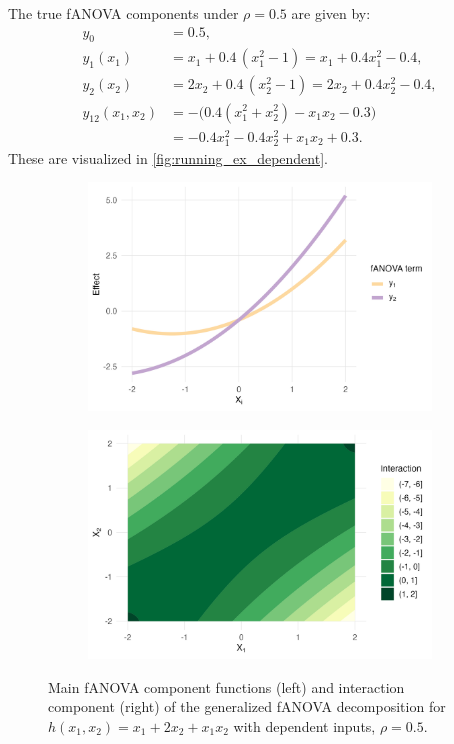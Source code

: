 The true fANOVA components under $\rho = 0.5$ are given by:
\begin{align*}
y_0 &= 0.5, \\[3pt]
y_1(x_1) &= x_1 + 0.4\,(x_1^2 - 1)
        = x_1 + 0.4x_1^2 - 0.4, \\[3pt]
y_2(x_2) &= 2x_2 + 0.4\,(x_2^2 - 1)
        = 2x_2 + 0.4x_2^2 - 0.4, \\[3pt]
y_{12}(x_1,x_2) 
&= -\Big( 0.4(x_1^2 + x_2^2) - x_1 x_2 - 0.3 \Big) \\[3pt]
&= -0.4x_1^2 - 0.4x_2^2 + x_1 x_2 + 0.3.
\end{align*}
These are visualized in \autoref{fig:running_ex_dependent}.
\begin{figure}[htpb]
    \centering
    \begin{subfigure}[t]{0.49\textwidth}
        \centering
        \includegraphics[width=\textwidth]{images/experiment_section/running_example_a1p10_a2p20_a11p00_a22p00_a12p10_rhop05_main.png}
    \end{subfigure}%
    \hfill
    \begin{subfigure}[t]{0.49\textwidth}
        \centering
        \includegraphics[width=\textwidth]{images/experiment_section/running_example_a1p10_a2p20_a11p00_a22p00_a12p10_rhop05_interaction.png}
    \end{subfigure}
    \caption{Main fANOVA component functions (left) and interaction component (right) of the generalized fANOVA decomposition for $h(x_1, x_2) = x_1 + 2 x_2 + x_1 x_2$ with dependent inputs, $\rho = 0.5$.}
    \label{fig:running_ex_dependent}
\end{figure}
